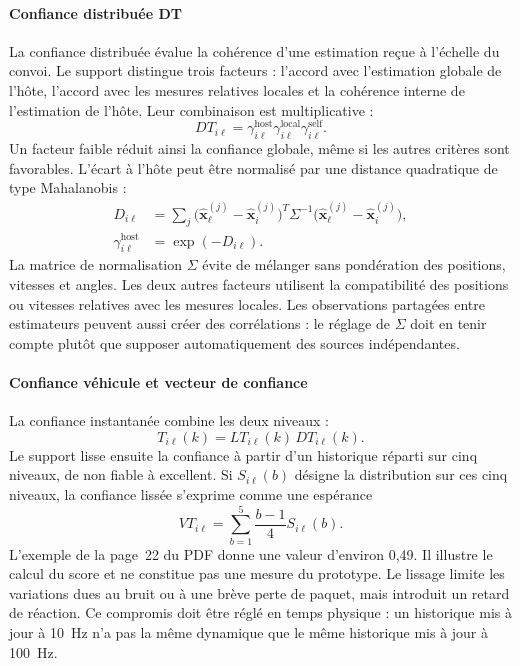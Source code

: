 \paragraph{Confiance distribuée DT}
La confiance distribuée évalue la cohérence d'une estimation reçue à l'échelle du convoi. Le support distingue trois facteurs : l'accord avec l'estimation globale de l'hôte, l'accord avec les mesures relatives locales et la cohérence interne de l'estimation de l'hôte. Leur combinaison est multiplicative :
\begin{equation}
DT_{i\ell}=\gamma_{i\ell}^{\mathrm{host}}
\gamma_{i\ell}^{\mathrm{local}}
\gamma_{i\ell}^{\mathrm{self}}.
\end{equation}
Un facteur faible réduit ainsi la confiance globale, même si les autres critères sont favorables. L'écart à l'hôte peut être normalisé par une distance quadratique de type Mahalanobis :
\begin{align}
D_{i\ell}&=\sum_j
\bigl(\widehat{\boldsymbol{x}}_\ell^{(j)}-
\widehat{\boldsymbol{x}}_i^{(j)}\bigr)^T\Sigma^{-1}
\bigl(\widehat{\boldsymbol{x}}_\ell^{(j)}-
\widehat{\boldsymbol{x}}_i^{(j)}\bigr),\\
\gamma_{i\ell}^{\mathrm{host}}&=\exp(-D_{i\ell}).
\end{align}
La matrice de normalisation $\Sigma$ évite de mélanger sans pondération des positions, vitesses et angles. Les deux autres facteurs utilisent la compatibilité des positions ou vitesses relatives avec les mesures locales.  Les observations partagées entre estimateurs peuvent aussi créer des corrélations : le réglage de $\Sigma$ doit en tenir compte plutôt que supposer automatiquement des sources indépendantes.

\paragraph{Confiance véhicule et vecteur de confiance}
La confiance instantanée combine les deux niveaux :
\begin{equation}
T_{i\ell}(k)=LT_{i\ell}(k)\,DT_{i\ell}(k).
\end{equation}
Le support lisse ensuite la confiance à partir d'un historique réparti sur cinq niveaux, de non fiable à excellent. Si $S_{i\ell}(b)$ désigne la distribution sur ces cinq niveaux, la confiance lissée s'exprime comme une espérance
\begin{equation}
VT_{i\ell}=\sum_{b=1}^{5}\frac{b-1}{4}S_{i\ell}(b).
\end{equation}
L'exemple de la page~22 du PDF donne une valeur d'environ 0,49. Il illustre le calcul du score et ne constitue pas une mesure du prototype. Le lissage limite les variations dues au bruit ou à une brève perte de paquet, mais introduit un retard de réaction. Ce compromis doit être réglé en temps physique : un historique mis à jour à 10~Hz n'a pas la même dynamique que le même historique mis à jour à 100~Hz.

